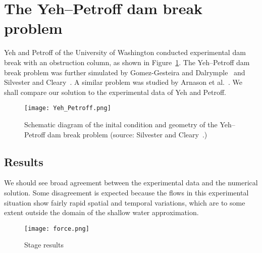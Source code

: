 
\section{The Yeh--Petroff dam break problem}
Yeh and Petroff of the University of Washington conducted experimental dam break with an obstruction column, as shown in Figure~\ref{fig:YP}.
The Yeh--Petroff dam break problem was further simulated by Gomez-Gesteira and Dalrymple~\cite{GD2004} and Silvester and Cleary~\cite{SC2006}. A similar problem was studied by Arnason et al.~\cite{APY2009}.
We shall compare our \anuga{} solution to the experimental data of Yeh and Petroff.

\begin{figure}
\begin{center}
\texttt{[image: Yeh\_Petroff.png]}
\end{center}
\caption{Schematic diagram of the inital condition and geometry of the Yeh--Petroff dam break problem (source: Silvester and Cleary~\cite{SC2006}.)} \label{fig:YP}
\end{figure}




\subsection{Results}

We should see broad agreement between the experimental data and the numerical solution. Some disagreement is expected because the flows in this experimental situation show fairly rapid spatial and temporal variations, which are to some extent outside the domain of the shallow water approximation.

\begin{figure}
\begin{center}
\texttt{[image: force.png]}
\end{center}
\caption{Stage results}
\end{figure}
%
%
%
%


\endinput
